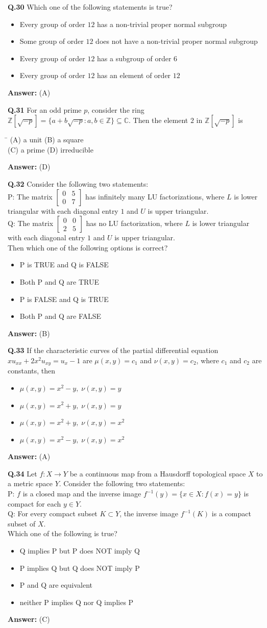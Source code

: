 \documentclass[11pt,a4paper]{article}
\newcommand{\optsfourA}[4]{%
  \begin{tabbing}
    \hspace{0.48\linewidth}\=\kill
    (A) #1 \> (B) #2 \\[2pt]
    (C) #3 \> (D) #4
  \end{tabbing}%
}
\newcommand{\optslistA}[4]{%
  \begin{itemize}
    \setlength{\itemsep}{2pt}\setlength{\parskip}{0pt}
    \item[(A)] #1
    \item[(B)] #2
    \item[(C)] #3
    \item[(D)] #4
  \end{itemize}%
}
\newcommand{\ans}[1]{\textbf{Answer:} #1\par\medskip}
\begin{document}
\textbf{Q.30} Which one of the following statements is true?
\optslistA{Every group of order $12$ has a non-trivial proper normal subgroup}{Some group of order $12$ does not have a non-trivial proper normal subgroup}{Every group of order $12$ has a subgroup of order $6$}{Every group of order $12$ has an element of order $12$}
\ans{(A)}

\textbf{Q.31} For an odd prime $p$, consider the ring $\mathbb{Z}[\sqrt{-p}] = \{a + b\sqrt{-p} : a, b \in \mathbb{Z}\} \subseteq \mathbb{C}$. Then the element $2$ in $\mathbb{Z}[\sqrt{-p}]$ is
\optsfourA{a unit}{a square}{a prime}{irreducible}
\ans{(D)}

\textbf{Q.32} Consider the following two statements:\\
P: The matrix $\begin{bmatrix} 0 & 5 \\ 0 & 7 \end{bmatrix}$ has infinitely many LU factorizations, where $L$ is lower triangular with each diagonal entry $1$ and $U$ is upper triangular.\\
Q: The matrix $\begin{bmatrix} 0 & 0 \\ 2 & 5 \end{bmatrix}$ has no LU factorization, where $L$ is lower triangular with each diagonal entry $1$ and $U$ is upper triangular.\\
Then which one of the following options is correct?
\optslistA{P is TRUE and Q is FALSE}{Both P and Q are TRUE}{P is FALSE and Q is TRUE}{Both P and Q are FALSE}
\ans{(B)}

\textbf{Q.33} If the characteristic curves of the partial differential equation $x u_{xx} + 2x^2 u_{xy} = u_x - 1$ are $\mu(x, y) = c_1$ and $\nu(x, y) = c_2$, where $c_1$ and $c_2$ are constants, then
\optslistA{$\mu(x, y) = x^2 - y,\; \nu(x, y) = y$}{$\mu(x, y) = x^2 + y,\; \nu(x, y) = y$}{$\mu(x, y) = x^2 + y,\; \nu(x, y) = x^2$}{$\mu(x, y) = x^2 - y,\; \nu(x, y) = x^2$}
\ans{(A)}

\textbf{Q.34} Let $f : X \to Y$ be a continuous map from a Hausdorff topological space $X$ to a metric space $Y$. Consider the following two statements:\\
P: $f$ is a closed map and the inverse image $f^{-1}(y) = \{x \in X : f(x) = y\}$ is compact for each $y \in Y$.\\
Q: For every compact subset $K \subset Y$, the inverse image $f^{-1}(K)$ is a compact subset of $X$.\\
Which one of the following is true?
\optslistA{Q implies P but P does NOT imply Q}{P implies Q but Q does NOT imply P}{P and Q are equivalent}{neither P implies Q nor Q implies P}
\ans{(C)}
\end{document}
